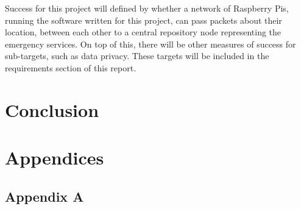 \documentclass{report}
\begin{document}
Success for this project will defined by whether a network of Raspberry Pis, running the software written for this project, can pass packets about their location, between each other to a central repository node representing the emergency services. On top of this, there will be other measures of success for sub-targets, such as data privacy. These targets will be included in the requirements section of this report.


\chapter{Conclusion}

\newpage
\appendix
\addappheadtotoc
\chapter*{Appendices}
\section*{Appendix A}



\newpage
{}
{}

\end{document}
